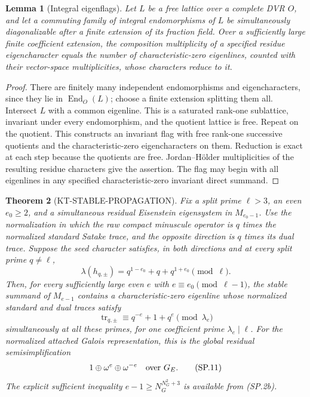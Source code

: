 \documentclass[11pt,a4paper]{article}
\newtheorem{theorem}{Theorem}[section]
\newtheorem{lemma}[theorem]{Lemma}
\theoremstyle{definition}
\begin{document}
\begin{lemma}[Integral eigenflags]
Let $L$ be a free lattice over a complete DVR $O$, and
let a commuting family of integral endomorphisms of $L$
be simultaneously diagonalizable after a finite extension
of its fraction field. Over a sufficiently large finite
coefficient extension, the composition multiplicity of a
specified residue eigencharacter equals the number of
characteristic-zero eigenlines, counted with their vector-space
multiplicities, whose characters reduce to it.
\end{lemma}

\begin{proof}
There are finitely many independent endomorphisms and
eigencharacters, since they lie in $\operatorname{End}_O(L)$;
choose a finite extension splitting them all. Intersect $L$
with a common eigenline. This is a saturated rank-one
sublattice, invariant under every endomorphism, and the
quotient lattice is free. Repeat on the quotient. This
constructs an invariant flag with free rank-one successive
quotients and the characteristic-zero eigencharacters on
them. Reduction is exact at each step because the
quotients are free. Jordan--H\"older multiplicities of the
resulting residue characters give the assertion. The
flag may begin with all eigenlines in any specified
characteristic-zero invariant direct summand.
\end{proof}

\begin{theorem}[KT-STABLE-PROPAGATION]
Fix a split prime $\ell>3$, an even $e_0\geq2$, and a
simultaneous residual Eisenstein eigensystem in $M_{e_0-1}$.
Use the normalization in which the raw compact minuscule
operator is $q$ times the normalized standard Satake
trace, and the opposite direction is $q$ times its dual
trace. Suppose the seed character satisfies, in both
directions and at every split prime $q\ne\ell$,
\[
                 \lambda(h_{q,\pm})
                       =q^{1-e_0}+q+q^{1+e_0}\pmod\ell.
                                                               \tag{SP.9}
\]
Then, for every sufficiently large even $e$ with
$e\equiv e_0\pmod{\ell-1}$, the stable summand of
$M_{e-1}$ contains a characteristic-zero eigenline
whose normalized standard and dual traces satisfy
\[
                \operatorname{tr}_{q,\pm}
                   \equiv q^{-e}+1+q^e\pmod\lambda_e
                                                               \tag{SP.10}
\]
simultaneously at all these primes, for one coefficient
prime $\lambda_e\mid\ell$.
For the normalized attached Galois representation, this
is the global residual semisimplification
\[
                     1\oplus\omega^e\oplus\omega^{-e}
                              \quad\hbox{over }G_E.
                                                               \tag{SP.11}
\]
The explicit sufficient inequality
$e-1\geq N_G^{N_G^2+3}$ is available from (SP.2b).
\end{theorem}
\end{document}
